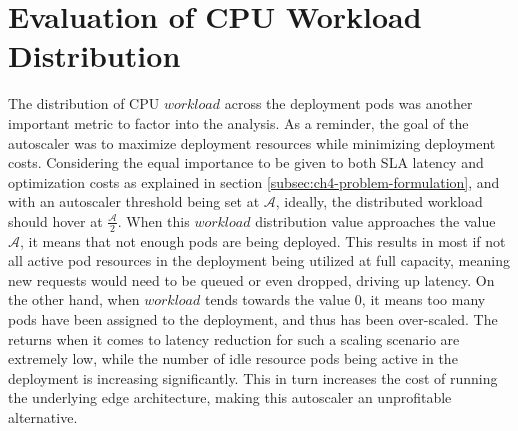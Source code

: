 \section{Evaluation of CPU Workload Distribution}
\label{sec:ch6-cpu-workload-eval}

The distribution of CPU $workload$ across the deployment pods was another important metric to factor into the analysis. As a reminder, the goal of the autoscaler was to maximize deployment resources while minimizing deployment costs. Considering the equal importance to be given to both SLA latency and optimization costs as explained in section \ref{subsec:ch4-problem-formulation}, and with an autoscaler threshold being set at $\mathcal{A}$, ideally, the distributed workload should hover at $\frac{\mathcal{A}}{2}$. When this $workload$ distribution value approaches the value $\mathcal{A}$, it means that not enough pods are being deployed. This results in most if not all active pod resources in the deployment being utilized at full capacity, meaning new requests would need to be queued or even dropped, driving up latency. On the other hand, when $workload$ tends towards the value $0$, it means too many pods have been assigned to the deployment, and thus has been over-scaled. The returns when it comes to latency reduction for such a scaling scenario are extremely low, while the number of idle resource pods being active in the deployment is increasing significantly. This in turn increases the cost of running the underlying edge architecture, making this autoscaler an unprofitable alternative.\par

